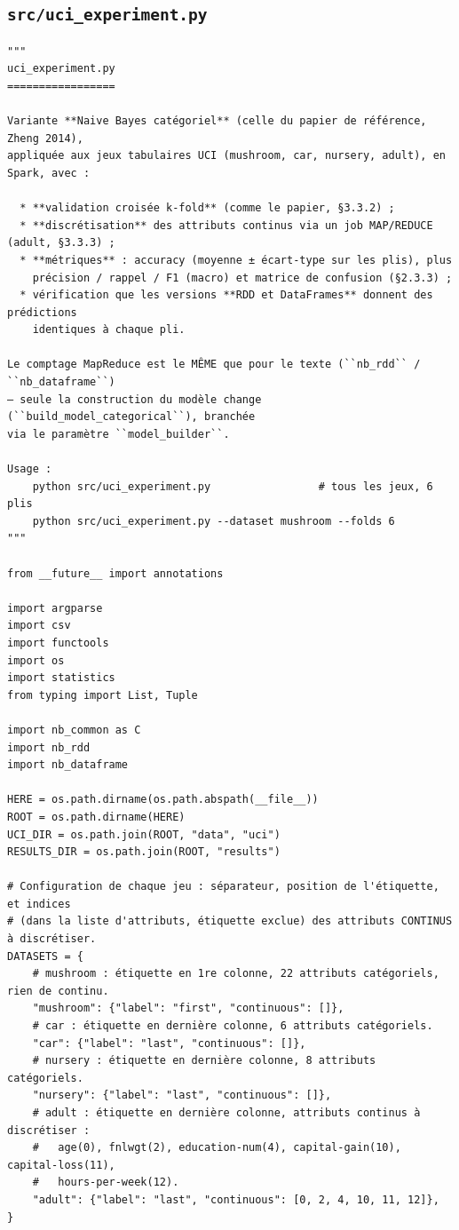 \subsection{\texttt{src/uci\_experiment.py}}
\begin{lstlisting}[style=py]
"""
uci_experiment.py
=================

Variante **Naive Bayes catégoriel** (celle du papier de référence, Zheng 2014),
appliquée aux jeux tabulaires UCI (mushroom, car, nursery, adult), en Spark, avec :

  * **validation croisée k-fold** (comme le papier, §3.3.2) ;
  * **discrétisation** des attributs continus via un job MAP/REDUCE (adult, §3.3.3) ;
  * **métriques** : accuracy (moyenne ± écart-type sur les plis), plus
    précision / rappel / F1 (macro) et matrice de confusion (§2.3.3) ;
  * vérification que les versions **RDD et DataFrames** donnent des prédictions
    identiques à chaque pli.

Le comptage MapReduce est le MÊME que pour le texte (``nb_rdd`` / ``nb_dataframe``)
— seule la construction du modèle change (``build_model_categorical``), branchée
via le paramètre ``model_builder``.

Usage :
    python src/uci_experiment.py                 # tous les jeux, 6 plis
    python src/uci_experiment.py --dataset mushroom --folds 6
"""

from __future__ import annotations

import argparse
import csv
import functools
import os
import statistics
from typing import List, Tuple

import nb_common as C
import nb_rdd
import nb_dataframe

HERE = os.path.dirname(os.path.abspath(__file__))
ROOT = os.path.dirname(HERE)
UCI_DIR = os.path.join(ROOT, "data", "uci")
RESULTS_DIR = os.path.join(ROOT, "results")

# Configuration de chaque jeu : séparateur, position de l'étiquette, et indices
# (dans la liste d'attributs, étiquette exclue) des attributs CONTINUS à discrétiser.
DATASETS = {
    # mushroom : étiquette en 1re colonne, 22 attributs catégoriels, rien de continu.
    "mushroom": {"label": "first", "continuous": []},
    # car : étiquette en dernière colonne, 6 attributs catégoriels.
    "car": {"label": "last", "continuous": []},
    # nursery : étiquette en dernière colonne, 8 attributs catégoriels.
    "nursery": {"label": "last", "continuous": []},
    # adult : étiquette en dernière colonne, attributs continus à discrétiser :
    #   age(0), fnlwgt(2), education-num(4), capital-gain(10), capital-loss(11),
    #   hours-per-week(12).
    "adult": {"label": "last", "continuous": [0, 2, 4, 10, 11, 12]},
}



\end{lstlisting}
